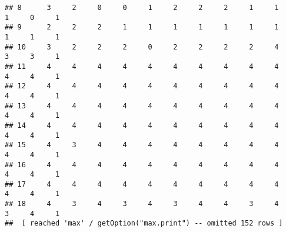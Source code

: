 \documentclass[
]{article}
\begin{document}
\begin{verbatim}
## 8      3     2     0     0     1     2     2     2     1     1     1     0     1
## 9      2     2     2     1     1     1     1     1     1     1     1     1     1
## 10     3     2     2     2     0     2     2     2     2     4     3     3     1
## 11     4     4     4     4     4     4     4     4     4     4     4     4     1
## 12     4     4     4     4     4     4     4     4     4     4     4     4     1
## 13     4     4     4     4     4     4     4     4     4     4     4     4     1
## 14     4     4     4     4     4     4     4     4     4     4     4     4     1
## 15     4     3     4     4     4     4     4     4     4     4     4     4     1
## 16     4     4     4     4     4     4     4     4     4     4     4     4     1
## 17     4     4     4     4     4     4     4     4     4     4     4     4     1
## 18     4     3     4     3     4     3     4     4     3     4     3     4     1
##  [ reached 'max' / getOption("max.print") -- omitted 152 rows ]
\end{verbatim}
\end{document}
